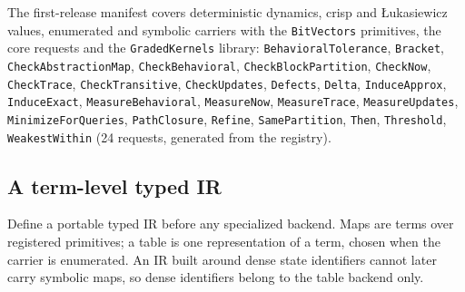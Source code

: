\documentclass[11pt]{article}
\newcommand{\code}[1]{\texttt{#1}}
\begin{document}
{\raggedright
The first-release manifest covers deterministic dynamics, crisp and \L{}ukasiewicz values, enumerated
and symbolic carriers with the \code{BitVectors} primitives, the core requests and the
\code{GradedKernels} library:
\code{BehavioralTolerance}, \code{Bracket}, \code{CheckAbstractionMap}, \code{CheckBehavioral}, \code{CheckBlockPartition}, \code{CheckNow}, \code{CheckTrace}, \code{CheckTransitive}, \code{CheckUpdates}, \code{Defects}, \code{Delta}, \code{InduceApprox}, \code{InduceExact}, \code{MeasureBehavioral}, \code{MeasureNow}, \code{MeasureTrace}, \code{MeasureUpdates}, \code{MinimizeForQueries}, \code{PathClosure}, \code{Refine}, \code{SamePartition}, \code{Then}, \code{Threshold}, \code{WeakestWithin} (24 requests, generated from the registry).\par}

\subsection{A term-level typed IR}\label{sec:ir}

Define a portable typed IR before any specialized backend. Maps are terms over registered primitives;
a table is one representation of a term, chosen when the carrier is enumerated. An IR built around
dense state identifiers cannot later carry symbolic maps, so dense identifiers belong to the table
backend only.
\end{document}
